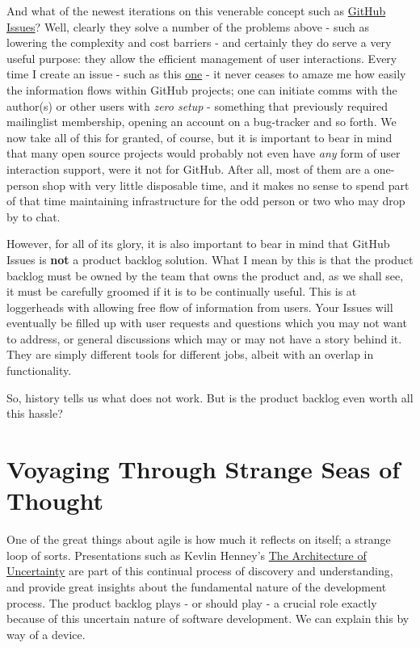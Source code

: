 \documentclass{book}
\begin{document}
And what of the newest iterations on this venerable concept such as
\href{https://guides.github.com/features/issues/}{GitHub Issues}? Well, clearly they solve a number of the problems
above - such as lowering the complexity and cost barriers - and
certainly they do serve a very useful purpose: they allow the
efficient management of user interactions. Every time I create an
issue - such as this \href{https://github.com/flycheck/flycheck/issues/852}{one} - it never ceases to amaze me how easily the
information flows within GitHub projects; one can initiate comms with
the author(s) or other users with \emph{zero setup} - something that
previously required mailinglist membership, opening an account on a
bug-tracker and so forth. We now take all of this for granted, of
course, but it is important to bear in mind that many open source
projects would probably not even have \emph{any} form of user interaction
support, were it not for GitHub. After all, most of them are a
one-person shop with very little disposable time, and it makes no
sense to spend part of that time maintaining infrastructure for the
odd person or two who may drop by to chat.

However, for all of its glory, it is also important to bear in mind
that GitHub Issues is \textbf{not} a product backlog solution. What I mean by
this is that the product backlog must be owned by the team that owns
the product and, as we shall see, it must be carefully groomed if it
is to be continually useful. This is at loggerheads with allowing free
flow of information from users. Your Issues will eventually be filled
up with user requests and questions which you may not want to address,
or general discussions which may or may not have a story behind
it. They are simply different tools for different jobs, albeit with an
overlap in functionality.

So, history tells us what does not work. But is the product backlog
even worth all this hassle?

\section*{Voyaging Through Strange Seas of Thought}
\label{sec-4}

One of the great things about agile is how much it reflects on itself;
a strange loop of sorts. Presentations such as Kevlin Henney's \href{http://www.infoq.com/presentations/architecture-uncertainty}{The
Architecture of Uncertainty} are part of this continual process of
discovery and understanding, and provide great insights about the
fundamental nature of the development process. The product backlog
plays - or should play - a crucial role exactly because of this
uncertain nature of software development. We can explain this by way
of a device.
\end{document}
